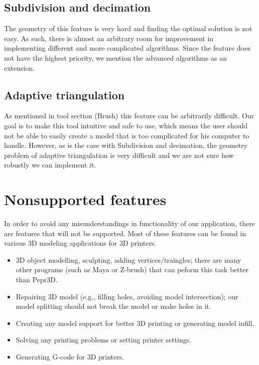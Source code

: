 \subsection{Subdivision and decimation}

The geometry of this feature is very hard and finding the optimal solution is not easy. As such, there is almost an arbitrary room for improvement in implementing different and more complicated algorithms. Since the feature does not have the highest priority, we mention the advanced algorithms as an extension.

\subsection{Adaptive triangulation}

As mentioned in tool section (Brush) this feature can be arbitrarily difficult. Our goal is to make this tool intuitive and safe to use, which means the user should not be able to easily create a model that is too complicated for his computer to handle. However, as is the case with Subdivision and decimation, the geometry problem of adaptive triangulation is very difficult and we are not sure how robustly we can implement it.


\section{Nonsupported features}

In order to avoid any misunderstandings in functionality of our application, there are features that will not be supported. Most of these features can be found in various 3D modeling applications for 3D printers.

\begin{itemize}
\item 3D object modelling, sculpting, adding vertices/traingles; there are many other programs (such as Maya or Z-brush) that can peform this task better than Pepr3D.
\item Repairing 3D model (e.g., filling holes, avoiding model intersection); our model splitting should not break the model or make holes in it.
\item Creating any model support for better 3D printing or generating model infill.
\item Solving any printing problems or setting printer settings.
\item Generating G-code for 3D printers.
\end{itemize}










